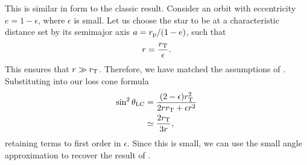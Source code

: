 This is similar in form to the classic result. Consider an orbit with eccentricity $e = 1 - \epsilon$, where $\epsilon$ is small. Let us choose the star to be at a characteristic distance set by its semimajor axis $a = r_\mathrm{p}/(1 - e)$, such that
\begin{equation}
r = \frac{r_\mathrm{T}}{\epsilon}.
\end{equation}
This ensures that $r \gg r_\mathrm{T}$. Therefore, we have matched the assumptions of \citet{Frank1976}. Substituting into our loss cone formula
\begin{align}
\sin^2\theta_\mathrm{LC} = {} & \frac{(2 - \epsilon)r_\mathrm{T}^2}{2rr_\mathrm{T} + \epsilon r^2} \nonumber \\
 \simeq {} & \frac{2r_\mathrm{T}}{3r},
\end{align}
retaining terms to first order in $\epsilon$. Since this is small, we can use the small angle approximation to recover the result of .
